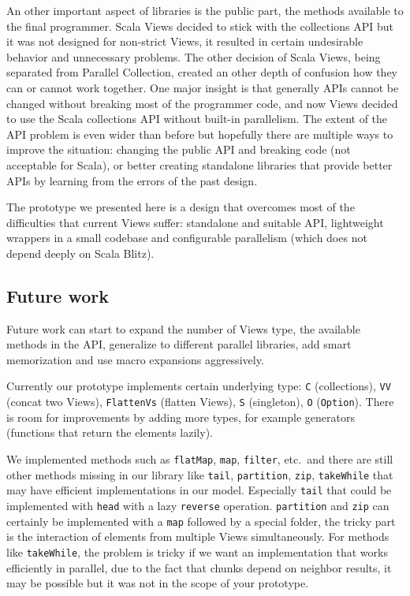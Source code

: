 \documentclass[a4paper,12pt,twocolumn]{article}
\begin{document}
An other important aspect of libraries is the public part, the methods available to the final programmer.
Scala Views decided to stick with the collections API but it was not designed for non-strict Views, it resulted in certain undesirable behavior and unnecessary problems.
The other decision of Scala Views, being separated from Parallel Collection, created an other depth of confusion how they can or cannot work together.
%
One major insight is that generally APIs cannot be changed without breaking most of the programmer code, and now Views decided to use the Scala collections API without built-in parallelism.
The extent of the API problem is even wider than before but hopefully there are multiple ways to improve the situation: changing the public API and breaking code (not acceptable for Scala), or better creating standalone libraries that provide better APIs by learning from the errors of the past design.

The prototype we presented here is a design that overcomes most of the difficulties that current Views suffer: standalone and suitable API, lightweight wrappers in a small codebase and configurable parallelism (which does not depend deeply on Scala Blitz).

\subsection{Future work}
Future work can start to expand the number of Views type, the available methods in the API, generalize to different parallel libraries, add smart memorization and use macro expansions aggressively.

Currently our prototype implements certain underlying type: \verb|C| (collections), \verb|VV| (concat two Views), \verb|FlattenVs| (flatten Views), \verb|S| (singleton), \verb|O| (\verb|Option|).
There is room for improvements by adding more types, for example generators (functions that return the elements lazily).

We implemented methods such as \verb|flatMap|, \verb|map|, \verb|filter|, etc.\ and there are still other methods missing in our library like \verb|tail|, \verb|partition|, \verb|zip|, \verb|takeWhile| that may have efficient implementations in our model.
Especially \verb|tail| that could be implemented with \verb|head| with a lazy \verb|reverse| operation.
\verb|partition| and \verb|zip| can certainly be implemented with a \verb|map| followed by a special folder, the tricky part is the interaction of elements from multiple Views simultaneously.
For methods like \verb|takeWhile|, the problem is tricky if we want an implementation that works efficiently in parallel, due to the fact that chunks depend on neighbor results, it may be possible but it was not in the scope of your prototype.
\end{document}

